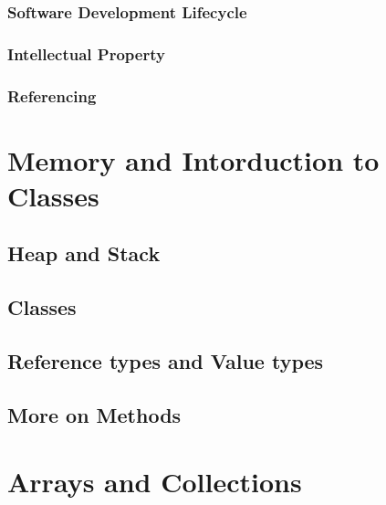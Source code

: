 \documentclass[
]{book}
\begin{document}
\hypertarget{software-development-lifecycle}{%
\subsection{Software Development Lifecycle}\label{software-development-lifecycle}}

\hypertarget{intellectual-property}{%
\subsection{Intellectual Property}\label{intellectual-property}}

\hypertarget{referencing}{%
\subsection{Referencing}\label{referencing}}

\hypertarget{memory-and-intorduction-to-classes}{%
\chapter{Memory and Intorduction to Classes}\label{memory-and-intorduction-to-classes}}

\hypertarget{heap-and-stack}{%
\section{Heap and Stack}\label{heap-and-stack}}

\hypertarget{classes}{%
\section{Classes}\label{classes}}

\hypertarget{reference-types-and-value-types}{%
\section{Reference types and Value types}\label{reference-types-and-value-types}}

\hypertarget{more-on-methods}{%
\section{More on Methods}\label{more-on-methods}}

\hypertarget{arrays-and-collections}{%
\chapter{Arrays and Collections}\label{arrays-and-collections}}
\end{document}
